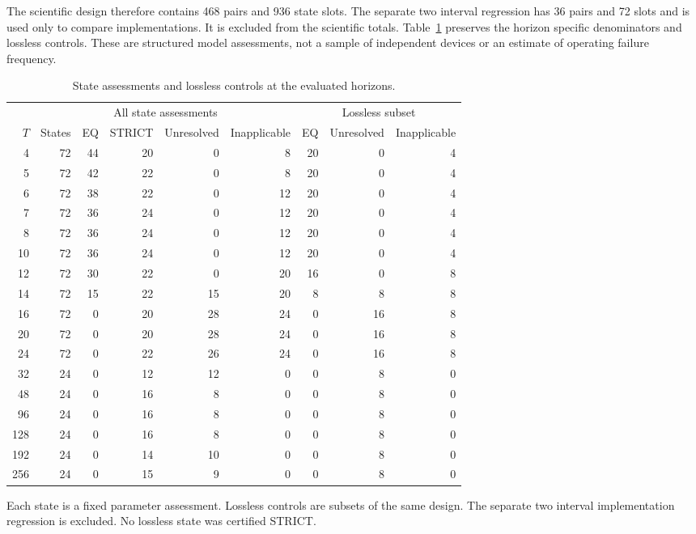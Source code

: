 The scientific design therefore contains 468 pairs and 936 state slots.
The separate two interval regression has 36 pairs and 72 slots and is used
only to compare implementations. It is excluded from the scientific totals.
Table~\ref{tab:horizons} preserves the horizon specific denominators and
lossless controls. These are structured model assessments, not a sample
of independent devices or an estimate of operating failure frequency.
\begin{table}[htbp]
\begingroup
\caption{State assessments and lossless controls at the evaluated horizons.}\label{tab:horizons}
\begin{tabular}{@{}rrrrrrrrr@{}}
\toprule
 &\multicolumn{5}{c}{All state assessments}&\multicolumn{3}{c}{Lossless subset}\\

$T$ & States & EQ & STRICT & Unresolved & Inapplicable & EQ & Unresolved & Inapplicable\\
\midrule
4 & 72 & 44 & 20 & 0 & 8 & 20 & 0 & 4\\
5 & 72 & 42 & 22 & 0 & 8 & 20 & 0 & 4\\
6 & 72 & 38 & 22 & 0 & 12 & 20 & 0 & 4\\
7 & 72 & 36 & 24 & 0 & 12 & 20 & 0 & 4\\
8 & 72 & 36 & 24 & 0 & 12 & 20 & 0 & 4\\
10 & 72 & 36 & 24 & 0 & 12 & 20 & 0 & 4\\
12 & 72 & 30 & 22 & 0 & 20 & 16 & 0 & 8\\
14 & 72 & 15 & 22 & 15 & 20 & 8 & 8 & 8\\
16 & 72 & 0 & 20 & 28 & 24 & 0 & 16 & 8\\
20 & 72 & 0 & 20 & 28 & 24 & 0 & 16 & 8\\
24 & 72 & 0 & 22 & 26 & 24 & 0 & 16 & 8\\
32 & 24 & 0 & 12 & 12 & 0 & 0 & 8 & 0\\
48 & 24 & 0 & 16 & 8 & 0 & 0 & 8 & 0\\
96 & 24 & 0 & 16 & 8 & 0 & 0 & 8 & 0\\
128 & 24 & 0 & 16 & 8 & 0 & 0 & 8 & 0\\
192 & 24 & 0 & 14 & 10 & 0 & 0 & 8 & 0\\
256 & 24 & 0 & 15 & 9 & 0 & 0 & 8 & 0\\
\bottomrule\end{tabular}
\par\smallskip\raggedright Each state is a fixed parameter assessment. Lossless controls are subsets of the same design. The separate two interval implementation regression is excluded. No lossless state was certified STRICT.
\endgroup
\end{table}


